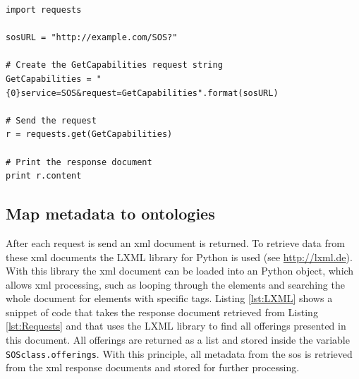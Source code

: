 \begin{lstlisting}[float,caption={Creating a HTTP Get request using Python's Request library}, label={lst:Requests}]
import requests

sosURL = "http://example.com/SOS?"

# Create the GetCapabilities request string
GetCapabilities = "{0}service=SOS&request=GetCapabilities".format(sosURL)

# Send the request
r = requests.get(GetCapabilities)

# Print the response document
print r.content

\end{lstlisting}   


\subsection{Map metadata to ontologies}
After each request is send an \ac{xml} document is returned. To retrieve data from these \ac{xml} documents the LXML library for Python is used (see \url{http://lxml.de}). With this library the \ac{xml} document can be loaded into an Python object, which allows \ac{xml} processing, such as looping through the elements and searching the whole document for elements with specific tags. Listing \ref{lst:LXML} shows a snippet of code that takes the response document retrieved from Listing \ref{lst:Requests} and that uses the LXML library to find all offerings presented in this document. All offerings are returned as a list and stored inside the variable \texttt{SOSclass.offerings}. With this principle, all metadata from the \ac{sos} is retrieved from the \ac{xml} response documents and stored for further processing.    

